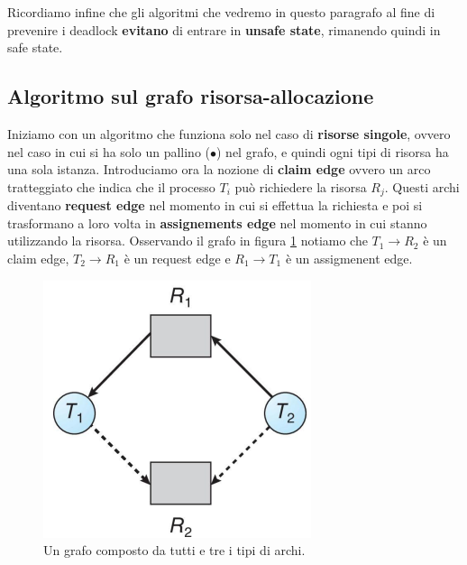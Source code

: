 \begin{figure}[h]
    \centering

\end{figure}

\noindent Ricordiamo infine che gli algoritmi che vedremo in questo paragrafo al fine di prevenire i deadlock \textbf{evitano} di entrare in \textbf{unsafe state}, rimanendo quindi in safe state.
% 
\subsection{Algoritmo sul grafo risorsa-allocazione}
Iniziamo con un algoritmo che funziona solo nel caso di \textbf{risorse singole}, ovvero nel caso in cui si ha solo un pallino ($\bullet$) nel grafo, e quindi ogni tipi di risorsa ha una sola istanza. Introduciamo ora la nozione di \textbf{claim edge} ovvero un arco tratteggiato che indica che il processo $T_i$ può richiedere la risorsa $R_j$. Questi archi diventano \textbf{request edge} nel momento in cui si effettua la richiesta e poi si trasformano a loro volta in \textbf{assignements edge} nel momento in cui stanno utilizzando la risorsa. Osservando il grafo in figura \ref{fig:claim_edge} notiamo che $T_1 \to R_2$ è un claim edge, $T_2 \to R_1$ è un request edge e $R_1 \to T_1$ è un assigmenent edge. 
\begin{figure}[h]
    \centering
    \includegraphics[width = .4\textwidth]{../res/imgs/deadlocks/claim_edge.png}
    \caption{Un grafo composto da tutti e tre i tipi di archi.}
    \label{fig:claim_edge}
\end{figure}

